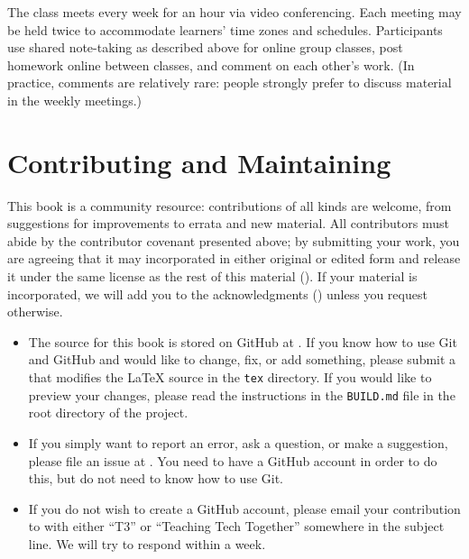 The class meets every week for an hour via video conferencing. Each
meeting may be held twice to accommodate learners' time zones and
schedules.  Participants use shared note-taking as described above for
online group classes, post homework online between classes, and
comment on each other's work. (In practice, comments are relatively
rare: people strongly prefer to discuss material in the weekly
meetings.)

\section{Contributing and Maintaining}\label{s:joining-contributing}

This book is a community resource: contributions of all kinds are
welcome, from suggestions for improvements to errata and new material.
All contributors must abide by the contributor covenant presented
above; by submitting your work, you are agreeing that it may
incorporated in either original or edited form and release it under
the same license as the rest of this material ().
If your material is incorporated, we will add you to the
acknowledgments () unless you request
otherwise.

\begin{itemize}

\item
  The source for this book is stored on GitHub at {\repository}.  If
  you know how to use Git and GitHub and would like to change, fix, or
  add something, please submit a  that modifies the LaTeX source in the \texttt{tex}
  directory.  If you would like to preview your changes, please read
  the instructions in the \texttt{BUILD.md} file in the root directory
  of the project.

\item
  If you simply want to report an error, ask a question, or make a
  suggestion, please file an issue at {\repository}. You need to have
  a GitHub account in order to do this, but do not need to know how to
  use Git.

\item
  If you do not wish to create a GitHub account, please email your
  contribution to {\email} with either ``T3'' or ``Teaching Tech
  Together'' somewhere in the subject line.  We will try to respond
  within a week.

\end{itemize}

